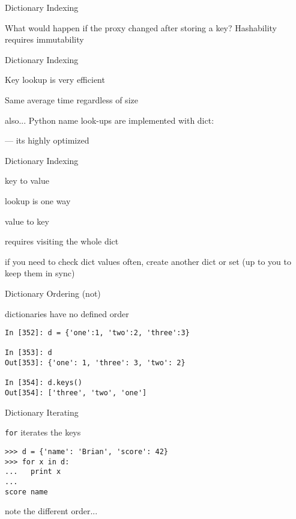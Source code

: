 \documentclass{beamer}
\begin{document}
\begin{frame}[fragile]{Dictionary Indexing}

\vfill
{\Large
What would happen if the proxy changed after storing a key?
}
\vfill
{\Large
Hashability requires immutability}
\vfill
\end{frame} 

\begin{frame}[fragile]{Dictionary Indexing}

\vfill
{\Large

Key lookup is very efficient

\vfill
Same average time regardless of size
}

\vfill
also... Python name look-ups are implemented with dict:

 --- its highly optimized
\end{frame} 


\begin{frame}[fragile]{Dictionary Indexing}

\vfill
{\Large
{\center 

key to value

lookup is one way

}}
\vfill
{\Large
{\center 

value to key

requires visiting the whole dict

}}

\vfill
{\Large
if you need to check dict values often, create another dict or set (up to you to keep them in sync)

}
\vfill
\end{frame} 

\begin{frame}[fragile]{Dictionary Ordering (not)}

\vfill
{\Large
dictionaries have no defined order
}
\vfill
\begin{verbatim}
In [352]: d = {'one':1, 'two':2, 'three':3}

In [353]: d
Out[353]: {'one': 1, 'three': 3, 'two': 2}

In [354]: d.keys()
Out[354]: ['three', 'two', 'one']
\end{verbatim}
\vfill
\end{frame} 

\begin{frame}[fragile]{Dictionary Iterating}

{\Large \verb|for| iterates the keys}
\vfill
\begin{verbatim}
>>> d = {'name': 'Brian', 'score': 42}
>>> for x in d:
...   print x
...
score name
\end{verbatim}
\vfill
{note the different order...}
\end{frame}
\end{document}
